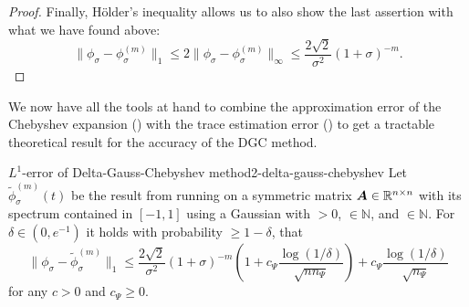 \begin{proof}
    Finally, Hölder's inequality \cite{klenke2013probability} 
    allows us to also show the last assertion with what we have found above:
    \begin{equation}
        \lVert \phi_{\sigma} - \phi_{\sigma}^{(m)} \rVert _1
            \leq 2 \lVert \phi_{\sigma} - \phi_{\sigma}^{(m)} \rVert _{\infty}
            \leq \frac{2\sqrt{2}}{\sigma^2} (1 + \sigma)^{-m}.
    \end{equation}
\end{proof}

We now have all the tools at hand to combine the approximation error of the
Chebyshev expansion () with the trace estimation
error () to get a tractable theoretical
result for the accuracy of the \gls{DGC} method.

\begin{theorem}{$L^1$-error of Delta-Gauss-Chebyshev method}{2-delta-gauss-chebyshev}
    Let $\widetilde{\phi}_{\sigma}^{(m)}(t)$ be the result from running 
    on a symmetric matrix $\boldsymbol{A} \in \mathbb{R}^{n \times n}$ with its spectrum contained in $[-1, 1]$ using
    a Gaussian  with
     $>0$,  $\in \mathbb{N}$, and
     $\in \mathbb{N}$. For $\delta \in (0, e^{-1})$ it holds with
    probability $\geq 1-\delta$, that
    \begin{equation}
        \lVert \phi_{\sigma} - \widetilde{\phi}_{\sigma}^{(m)}\rVert _1
        \leq \frac{2\sqrt{2}}{\sigma^2} (1 + \sigma)^{-m} \left( 1 + c_{\Psi} \frac{\log(1/\delta)}{\sqrt{n n_{\Psi}}} \right) + c_{\Psi} \frac{\log(1/\delta)}{\sqrt{n_{\Psi}}}
    \end{equation}
    for any $c>0$ and $c_{\Psi} \geq 0$.
\end{theorem}

